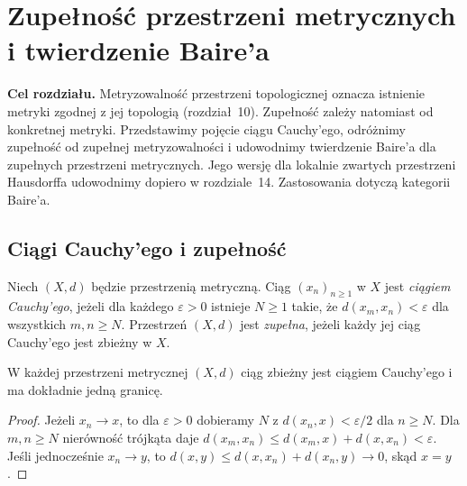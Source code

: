 \chapter{Zupełność przestrzeni metrycznych i twierdzenie Baire'a}
\label{ch:topog-baire}

\providecommand{\atlasref}[2]{#2}

\noindent\textbf{Cel rozdziału.}
Metryzowalność przestrzeni topologicznej oznacza istnienie metryki
zgodnej z jej topologią (rozdział~10). Zupełność zależy natomiast
od konkretnej metryki. Przedstawimy pojęcie ciągu Cauchy'ego,
odróżnimy zupełność od zupełnej metryzowalności i udowodnimy
twierdzenie Baire'a dla zupełnych przestrzeni metrycznych.
Jego wersję dla lokalnie zwartych przestrzeni Hausdorffa
udowodnimy dopiero w rozdziale~14.
Zastosowania dotyczą kategorii Baire'a.

\section{Ciągi Cauchy'ego i zupełność}
\label{sec:topog-baire-zupelnosc}

\begin{definicja}
\label{def:topog-baire-ciag-cauchyego}
Niech $(X,d)$ będzie przestrzenią metryczną.
Ciąg $(x_n)_{n\ge1}$ w $X$ jest \emph{ciągiem Cauchy'ego},
jeżeli dla każdego $\varepsilon>0$ istnieje $N\ge1$ takie,
że $d(x_m,x_n)<\varepsilon$ dla wszystkich $m,n\ge N$.
Przestrzeń $(X,d)$ jest \emph{zupełna}, jeżeli każdy
jej ciąg Cauchy'ego jest zbieżny w $X$.
\end{definicja}

\begin{stwierdzenie}
\label{prop:topog-baire-zbiezny-cauchy}
W każdej przestrzeni metrycznej $(X,d)$ ciąg zbieżny
jest ciągiem Cauchy'ego i ma dokładnie jedną granicę.
\end{stwierdzenie}
\begin{proof}
Jeżeli $x_n\to x$, to dla $\varepsilon>0$ dobieramy $N$
z $d(x_n,x)<\varepsilon/2$ dla $n\ge N$.
Dla $m,n\ge N$ nierówność trójkąta daje
$d(x_m,x_n)\le d(x_m,x)+d(x,x_n)<\varepsilon$.
Jeśli jednocześnie $x_n\to y$, to
$d(x,y)\le d(x,x_n)+d(x_n,y)\to0$, skąd $x=y$.
\end{proof}

